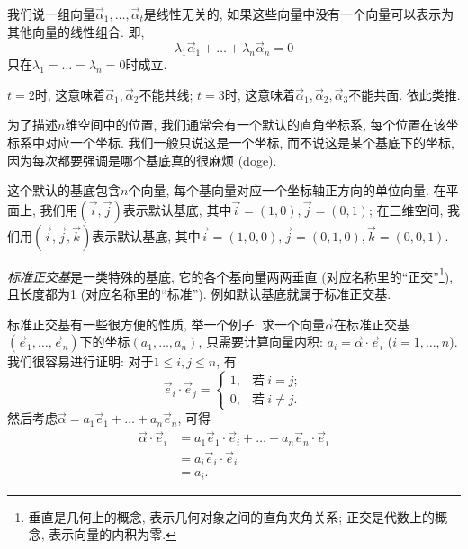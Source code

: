 \begin{definition}[线性无关]
  我们说一组向量$\vec\alpha_1,\dots,\vec\alpha_t$是线性无关的,
  如果这些向量中没有一个向量可以表示为其他向量的线性组合.
  即, \[
    \lambda_1\vec\alpha_1 + \dots + \lambda_n\vec\alpha_n = 0
  \]
  只在$\lambda_1=\dots=\lambda_n=0$时成立.

  $t=2$时, 这意味着$\vec\alpha_1,\vec\alpha_2$不能共线;
  $t=3$时, 这意味着$\vec\alpha_1,\vec\alpha_2,\vec\alpha_3$不能共面.
  依此类推.
\end{definition}

\begin{example}[默认基底]
  为了描述$n$维空间中的位置, 我们通常会有一个默认的直角坐标系,
  每个位置在该坐标系中对应一个坐标.
  我们一般只说这是一个坐标, 而不说这是某个基底下的坐标,
  因为每次都要强调是哪个基底真的很麻烦 (doge).

  这个默认的基底包含$n$个向量,
  每个基向量对应一个坐标轴正方向的单位向量.
  在平面上, 我们用$(\vec i,\vec j)$表示默认基底,
  其中$\vec i=(1,0), \vec j=(0,1)$;
  在三维空间, 我们用$(\vec i,\vec j,\vec k)$表示默认基底,
  其中$\vec i=(1,0,0), \vec j=(0,1,0), \vec k=(0,0,1)$.
\end{example}

\begin{example}[标准正交基]
  \emph{标准正交基}是一类特殊的基底,
  它的各个基向量两两垂直
  (对应名称里的``正交''\footnote{
    垂直是几何上的概念, 表示几何对象之间的直角夹角关系;
    正交是代数上的概念, 表示向量的内积为零.
  }), 且长度都为1 (对应名称里的``标准'').
  例如默认基底就属于标准正交基.

  标准正交基有一些很方便的性质, 举一个例子:
  求一个向量$\vec\alpha$在标准正交基
  $(\vec e_1,\dots,\vec e_n)$下的坐标$(a_1,\dots,a_n)$,
  只需要计算向量内积:
  $a_i = \vec\alpha \cdot \vec e_i$ ($i=1,\dots,n$).
  我们很容易进行证明:
  对于$1\le i,j \le n$, 有
  \[
    \vec e_i \cdot \vec e_j =
    \begin{cases}
      1, & 若\ i = j;    \\
      0, & 若\ i \neq j.
    \end{cases}
  \]
  然后考虑$\vec\alpha = a_1\vec e_1 + \dots + a_n\vec e_n$, 可得
  \begin{align*}
    \vec\alpha \cdot \vec e_i
     & = a_1\vec e_1\cdot\vec e_i + \dots
    + a_n\vec e_n\cdot\vec e_i            \\
     & = a_i\vec e_i\cdot\vec e_i         \\
     & = a_i.
  \end{align*}
\end{example}

